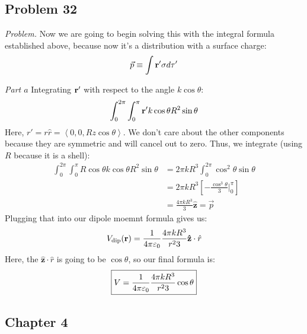 \documentclass[10pt,oneside]{book}
\newcommand{\gspc}{\vspace{0.13cm}} %
\newenvironment{problem}[1]
  {\vspace{-0.1cm}\begin{tcolorbox}[problembox]
   \textit{Problem. }#1}
  {\end{tcolorbox}\gspc}
\newenvironment{subproblem}[2]
  {\vspace{-0.1cm}\begin{tcolorbox}[subproblembox]
   \textit{#1 }#2}
  {\end{tcolorbox}\gspc}
\newcommand{\unit}[1]{\mathbf{\hat{#1}}}
\newcommand{\pvec}[1]{\left\langle#1\right\rangle}
\begin{document}
\subsection*{Problem 32}
\begin{problem}
  Now we are going to begin solving this with the integral formula established above, because now it's a distribution with a surface charge:
  \begin{align*}
    \vec p \equiv \int {\mathbf{r}}' \sigma d\tau'
  \end{align*}
  \begin{subproblem}{Part $a$}
    Integrating ${\mathbf{r}}'$ with respect to the angle $k\cos\theta$:
    \begin{align*}
      \int_0^{2\pi}\int_0^\pi{\mathbf{r}}' k\cos\theta R^2 \sin\theta 
    \end{align*}
    Here, $r' = r\hat r = \pvec{0, 0, Rz\cos\theta}$. We don't care about the other components because they are symmetric and will cancel out to zero. Thus, we integrate (using $R$ because it is a shell):
    \begin{align*}
      \int_0^{2\pi}\int_0^\pi R\cos\theta k\cos\theta R^2\sin\theta &= 2\pi kR^3\int_0^{2\pi}\cos^2\theta \sin\theta\\
      &= 2\pi k R^3\left[-\frac{\cos^3\theta}3\Bigg|_0^\pi\right]\\
      &= \frac{4\pi k R^3}{3}\unit{z} = \vec p
    \end{align*}
    Plugging that into our dipole moemnt formula gives us:
    \begin{align*}
      V_\text{dip}(\vr) = \fpie \frac{4\pi k R^3}{r^23}\unit{z}\cdot \hat r
    \end{align*}
    Here, the $\unit{z}\cdot \hat r$ is going to be $\cos\theta$, so our final formula is:
    \begin{align*}
      \boxed{V = \frac{1}{4\pi\varepsilon_0} \frac{4\pi k R^3}{r^23}\cos\theta}
    \end{align*}
  \end{subproblem}
\end{problem}

\subsection*{Chapter 4}
\end{document}
